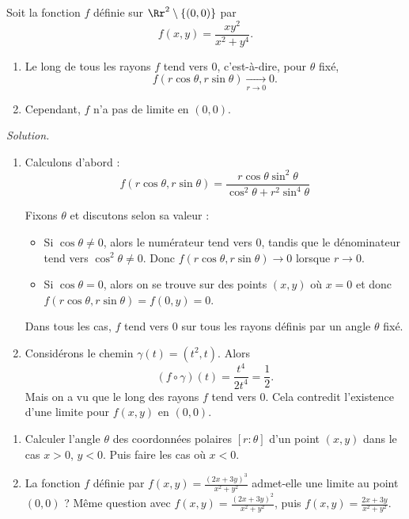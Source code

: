 \documentclass[11pt, class=report,crop=false]{standalone}
\begin{document}
\begin{exemple}
Soit la fonction $f$ définie sur $\Rr^2 \setminus \{(0,0)\}$ par
$$f(x,y)=\frac{xy^2}{x^2+y^4}.$$
\begin{enumerate}
  \item Le long de tous les rayons $f$ tend vers $0$, c'est-à-dire, pour $\theta$ fixé,
$$f(r\cos\theta,r\sin\theta) \underset{r \to 0}{\longrightarrow} 0.$$
  \item Cependant, $f$ n'a pas de limite en $(0,0)$.
\end{enumerate}


\bigskip
\emph{Solution.}
\begin{enumerate}
  \item Calculons d'abord :
  $$f(r\cos\theta,r\sin\theta) 
  = \frac{r\cos\theta\sin^2\theta}{\cos^2\theta + r^2\sin^4\theta}$$
  
  Fixons $\theta$ et discutons selon sa valeur :
  \begin{itemize}
    \item Si $\cos\theta \neq 0$, alors le numérateur tend vers $0$, tandis que le dénominateur tend vers $\cos^2\theta \neq0$. Donc $f(r\cos\theta,r\sin\theta) \to 0$ lorsque $r\to0$.
    
    \item Si $\cos\theta = 0$, alors on se trouve sur des points $(x,y)$ où $x=0$ et donc 
    $f(r\cos\theta,r\sin\theta)=f(0,y)=0$.    
  \end{itemize}
  Dans tous les cas, $f$ tend vers $0$ sur tous les rayons définis par un angle $\theta$ fixé.
  
  
  \item Considérons le chemin $\gamma(t) = (t^2,t)$. Alors 
  $$(f \circ \gamma)(t) = \frac{t^4}{2t^4} = \frac12.$$
  Mais on a vu que le long des rayons $f$ tend vers $0$. 
  Cela contredit l'existence d'une limite pour $f(x,y)$ en $(0,0)$.
 

\end{enumerate}  

\end{exemple}
 
\begin{miniexercices}
\sauteligne
\begin{enumerate}

 \item Calculer l'angle $\theta$ des coordonnées polaires $[r:\theta]$ 
 d'un point $(x,y)$ dans le cas $x>0$, $y <0$. 
 Puis faire les cas où $x<0$.

  \item La fonction $f$ définie par $f(x,y)=\frac{(2x+3y)^3}{x^2+y^2}$  
  admet-elle une limite au point $(0,0)$ ?
  Même question avec $f(x,y)=\frac{(2x+3y)^2}{x^2+y^2}$, puis $f(x,y)=\frac{2x+3y}{x^2+y^2}$.

\end{enumerate}
\end{miniexercices}




\finchapitre 
\end{document}
